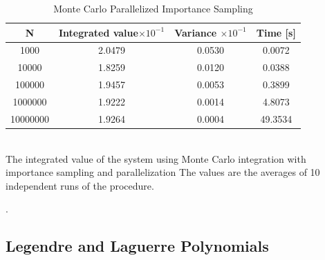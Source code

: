 \documentclass[%
reprint,
amsmath,amssymb,
aps,
]{revtex4-1}
\begin{document}
\begin{table}[!h]
	\caption{Monte Carlo Parallelized Importance Sampling }
	\begin{tabular}{|c|c|c|c|}
		\hline 
		\hspace{5mm} \textbf{N} \hspace{5mm} & \textbf{Integrated value}$\times 10^{-1}$ & \hspace{3mm} \textbf{Variance} $\times 10^{-1}$ & \hspace{3mm} \textbf{Time  [s]} \hspace{5mm}\\
		\hline 
			1000 & 2.0479  & 0.0530  & 0.0072 \\
			10000 & 1.8259  & 0.0120  & 0.0388 \\
			100000 & 1.9457  & 0.0053  & 0.3899 \\
			1000000 & 1.9222  & 0.0014  & 4.8073 \\
			10000000 & 1.9264  & 0.0004  & 49.3534 \\
		\hline 
	\end{tabular} \\ [3pt]
	\label{mc_values_par} \centering The integrated value of the system using Monte Carlo integration with importance sampling and parallelization The values are the averages of 10 independent runs of the procedure.
\end{table}

\newpage. \newpage
\subsection{Legendre and Laguerre Polynomials}
\end{document}
